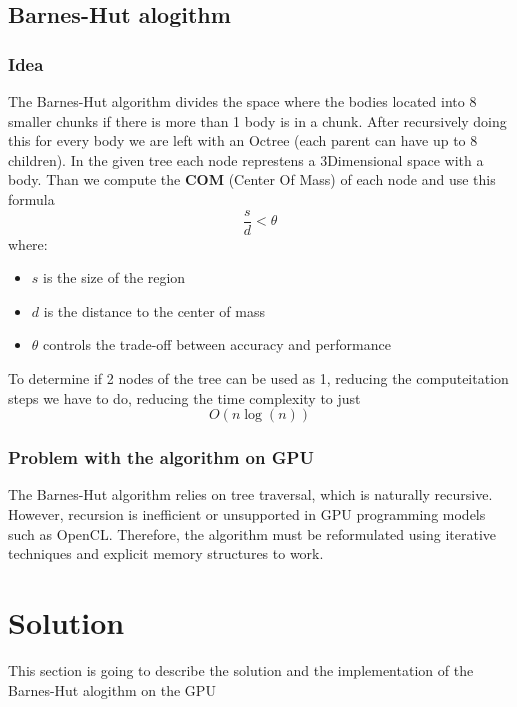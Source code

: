 \documentclass[12pt]{article}
\begin{document}
\subsection{Barnes-Hut alogithm}
\subsubsection{Idea}
The Barnes-Hut algorithm divides the space where the bodies located into 8 smaller chunks
if there is more than 1 body is in a chunk. After recursively doing this for every body
we are left with an Octree (each parent can have up to 8 children).
In the given tree each node represtens a 3Dimensional space with a body.
Than we compute the \textbf{COM} (Center Of Mass) of each node and use this formula
\[\frac{s}{d} < \theta  \] 
where:
\begin{itemize}
    \item $s$ is the size of the region
    \item $d$ is the distance to the center of mass
    \item $\theta$ controls the trade-off between accuracy and performance
\end{itemize}
To determine if 2 nodes of the tree can be used as 1, reducing the computeitation steps we have to do, reducing the time complexity
to just \[O(n \log(n))\]

\begin{center}
\end{center}

\subsubsection{Problem with the algorithm on GPU}
The Barnes-Hut algorithm relies on tree traversal, which is naturally recursive.
However, recursion is inefficient or unsupported in GPU programming models such as OpenCL.
Therefore, the algorithm must be reformulated using iterative techniques
and explicit memory structures to work.

\section{Solution}
This section is going to describe the solution and the implementation of the Barnes-Hut alogithm on the GPU
\end{document}

